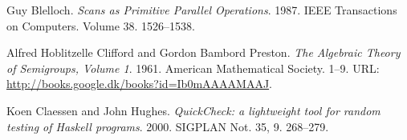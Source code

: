 \begin{thebibliography}{1}




Guy Blelloch. \emph{Scans as Primitive Parallel Operations}. 1987. IEEE
Transactions on Computers. Volume 38. 1526--1538.


Alfred Hoblitzelle Clifford and Gordon Bambord Preston. \emph{The Algebraic
Theory of Semigroups, Volume 1}. 1961. American Mathematical Society. 1--9.
URL: \url{http://books.google.dk/books?id=Ib0mAAAAMAAJ}.


Koen Claessen and John Hughes. \emph{QuickCheck: a lightweight tool for random
testing of Haskell programs}. 2000. SIGPLAN Not. 35, 9. 268--279.

\end{thebibliography}
